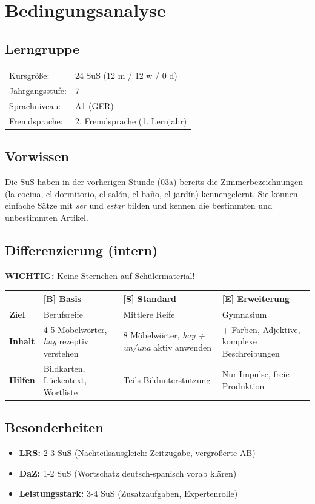 \documentclass[11pt,a4paper]{article}
\newcommand{\jahrgangsstufe}{7}
\newcommand{\lerngruppengroesse}{24}
\newcommand{\maennlich}{12}
\newcommand{\weiblich}{12}
\newcommand{\divers}{0}
\newcommand{\gerniveau}{A1}
\newcommand{\B}{\textcolor{basis}{\textbf{[B]}}}
\newcommand{\Std}{\textcolor{standard}{\textbf{[S]}}}
\newcommand{\E}{\textcolor{erweiterung}{\textbf{[E]}}}
\begin{document}
\section{Bedingungsanalyse}

\subsection{Lerngruppe}
\begin{tabular}{ll}
    Kursgröße: & \lerngruppengroesse{} SuS (\maennlich{} m / \weiblich{} w / \divers{} d) \\
    Jahrgangsstufe: & \jahrgangsstufe \\
    Sprachniveau: & \gerniveau{} (GER) \\
    Fremdsprache: & 2. Fremdsprache (1. Lernjahr) \\
\end{tabular}

\subsection{Vorwissen}
Die SuS haben in der vorherigen Stunde (03a) bereits die Zimmerbezeichnungen (la cocina, el dormitorio, el salón, el baño, el jardín) kennengelernt. Sie können einfache Sätze mit \textit{ser} und \textit{estar} bilden und kennen die bestimmten und unbestimmten Artikel.

\subsection{Differenzierung (intern)}

\textbf{WICHTIG:} Keine Sternchen auf Schülermaterial!

\begin{tabular}{|l|p{4cm}|p{4cm}|p{4cm}|}
\hline
& \textbf{\B{} Basis} & \textbf{\Std{} Standard} & \textbf{\E{} Erweiterung} \\
\hline
\textbf{Ziel} & Berufsreife & Mittlere Reife & Gymnasium \\
\hline
\textbf{Inhalt} & 4-5 Möbelwörter, \textit{hay} rezeptiv verstehen & 8 Möbelwörter, \textit{hay + un/una} aktiv anwenden & + Farben, Adjektive, komplexe Beschreibungen \\
\hline
\textbf{Hilfen} & Bildkarten, Lückentext, Wortliste & Teils Bildunterstützung & Nur Impulse, freie Produktion \\
\hline
\end{tabular}

\subsection{Besonderheiten}
\begin{itemize}
    \item \textbf{LRS:} 2-3 SuS (Nachteilsausgleich: Zeitzugabe, vergrößerte AB)
    \item \textbf{DaZ:} 1-2 SuS (Wortschatz deutsch-spanisch vorab klären)
    \item \textbf{Leistungsstark:} 3-4 SuS (Zusatzaufgaben, Expertenrolle)
\end{itemize}
\end{document}
